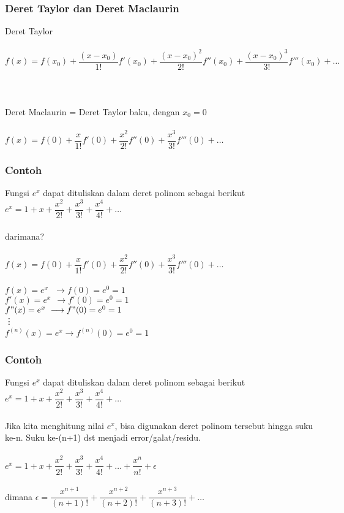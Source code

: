 \documentclass{beamer}
\begin{document}

\begin{frame}
\frametitle{Deret Taylor dan Deret Maclaurin}
Deret Taylor\\\ \\
$f(x) = f(x_0)+ \dfrac{(x-x_0)}{1!}f'(x_0) + \dfrac{(x-x_0)^2}{2!}f''(x_0) + \dfrac{(x-x_0)^3}{3!}f'''(x_0) + \dots $
\\\ \\\ \\\ \\Deret Maclaurin = Deret Taylor baku, dengan $x_0=0$\\\ \\
$f(x) = f(0)+ \dfrac{x}{1!}f'(0) + \dfrac{x^2}{2!}f''(0) + \dfrac{x^3}{3!}f'''(0) + \dots $

\end{frame}


\begin{frame}
\frametitle{Contoh}
Fungsi $e^x$ dapat dituliskan dalam deret polinom sebagai berikut
$e^x = 1+x+ \dfrac{x^2}{2!} + \dfrac{x^3}{3!} + \dfrac{x^4}{4!} + \dots $
\\\ \\darimana? \\\ \\$f(x) = f(0)+ \dfrac{x}{1!}f'(0) + \dfrac{x^2}{2!}f''(0) + \dfrac{x^3}{3!}f'''(0) + \dots $
\\\ \\$f(x) = e^x \ \ \ \longrightarrow f(0) = e^0 = 1$
\\$f'(x) = e^x \ \ \longrightarrow f'(0) = e^0 = 1$
\\$f"(x) = e^x \ \longrightarrow f"(0) = e^0 = 1$
\\\qquad \qquad \qquad\vdots
\\$f^{(n)}(x) = e^x \longrightarrow f^{(n)}(0) = e^0 = 1$
\end{frame}



\begin{frame}
\frametitle{Contoh}
Fungsi $e^x$ dapat dituliskan dalam deret polinom sebagai berikut
$e^x = 1+x+ \dfrac{x^2}{2!} + \dfrac{x^3}{3!} + \dfrac{x^4}{4!} + \dots $
\\\ \\Jika kita menghitung nilai $e^x$, bisa digunakan deret polinom tersebut hingga suku ke-n. Suku ke-(n+1) dst menjadi error/galat/residu.
\\\ \\$e^x = 1+x+ \dfrac{x^2}{2!} + \dfrac{x^3}{3!} + \dfrac{x^4}{4!} + \dots + \dfrac{x^n}{n!} + \epsilon$
\\\ \\dimana $\epsilon = \dfrac{x^{n+1}}{(n+1)!} + \dfrac{x^{n+2}}{(n+2)!} + \dfrac{x^{n+3}}{(n+3)!} + \dots $

\end{frame}
\end{document}
